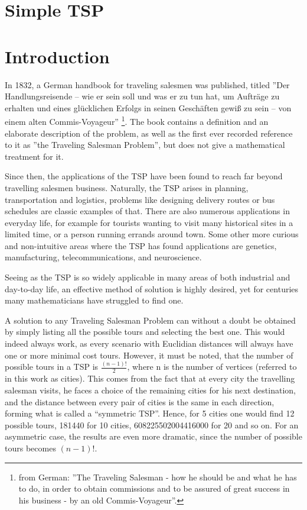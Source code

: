 \section{Simple TSP}

\section{Introduction}

\par
In 1832, a German handbook for traveling salesmen was published, titled ''Der Handlungsreisende – wie er sein soll und was er zu tun hat, um Aufträge zu erhalten und eines glücklichen Erfolgs in seinen Geschäften gewiß zu sein – von einem alten Commis-Voyageur'' \footnote{%
	from German: ''The Traveling Salesman - how he should be and what he has to do, in order to obtain commissions and to be assured of great success in his business - by an old Commis-Voyageur''.}. 
 The book contains a definition and an elaborate description of the problem, as well as the first ever recorded reference to it as ''the Traveling Salesman Problem'', but does not give a mathematical treatment for it. 
 
\vspace{5mm}
Since then, the applications of the TSP have been found to reach far beyond travelling salesmen business. Naturally, the TSP arises in planning, transportation and logistics, problems like designing delivery routes or bus schedules are classic examples of that. There are also numerous applications in everyday life, for example for tourists wanting to visit many historical sites in a limited time, or a person running errands around town. Some other more curious and non-intuitive areas where the TSP has found applications are genetics, manufacturing, telecommunications, and neuroscience.

\vspace{5mm}
Seeing as the TSP is so widely applicable in many areas of both industrial and day-to-day life, an effective method of solution is highly desired, yet for centuries many mathematicians have struggled to find one.

\vspace{5mm}
A solution to any Traveling Salesman Problem can without a doubt be obtained by simply listing all the possible tours and selecting the best one. This would indeed always work, as every scenario with Euclidian distances will always have one or more minimal cost tours. However, it must be noted, that the number of possible tours in a TSP is $\frac{(n-1)!}{2}$, where n is the number of vertices (referred to in this work as cities). This comes from the fact that at every city the travelling salesman visits, he faces a choice of the remaining cities for his next destination, and the distance between every pair of cities is the same in each direction, forming what is called a “symmetric TSP”. Hence, for 5 cities one would find 12 possible tours, 181440 for 10 cities, 608225502004416000 for 20 and so on. For an asymmetric case, the results are even more dramatic, since the number of possible tours becomes $(n-1)!$.

